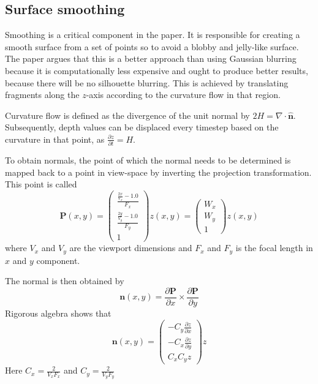 \subsection{Surface smoothing}
\label{sec:smoothing}
Smoothing is a critical component in the paper. It is responsible for creating a smooth surface from a set of points so to avoid a blobby and jelly-like surface. The paper argues that this is a better approach than using Gaussian blurring because it is computationally less expensive and ought to produce better results, because there will be no silhouette blurring. 
This is achieved by translating fragments along the $z$-axis according to the curvature flow in that region. 

Curvature flow is defined as the divergence of the unit normal by \(2H = \nabla \cdot \hat{\mathbf{n}}\). Subsequently, depth values can be displaced every timestep based on the curvature in that point, as \(\frac{\partial z}{\partial t} = H\).

To obtain normals, the point of which the normal needs to be determined is mapped back to a point in view-space by inverting the projection transformation.
This point is called \begin{equation}
	\label{eq:pcalc}
	\mathbf{P}(x, y) = \begin{pmatrix}\frac{\frac{2x}{V_x} - 1.0}{F_x}\\\frac{\frac{2y}{V_y} - 1.0}{F_y}\\1\end{pmatrix}z(x,y) = \begin{pmatrix}W_x\\W_y\\1\end{pmatrix}z(x,y)
\end{equation}
where \(V_x\) and \(V_y\) are the viewport dimensions and \(F_x\) and \(F_y\) is the focal length in \(x\) and \(y\) component.

The normal is then obtained by 
\begin{equation}
	\label{eq:norm}
	\mathbf{n}(x,y) = \frac{\partial \mathbf{P}}{\partial x} \times \frac{\partial \mathbf{P}}{\partial y}
\end{equation}
Rigorous algebra shows that 
\begin{equation}
	\label{eq:normals}
	\mathbf{n}(x,y) = \begin{pmatrix}-C_y\frac{\partial z}{\partial x}\\-C_x\frac{\partial z}{\partial y}\\C_xC_yz\end{pmatrix}z
\end{equation}
Here \(C_x = \frac{2}{V_xF_x}\) and \(C_y = \frac{2}{V_yF_y}\) 

